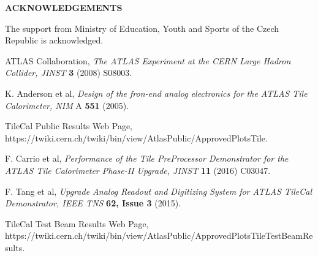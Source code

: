 \documentclass[10pt]{article}
\def\Acknowledgements{\bigskip  \bigskip \begin{center} \begin{large}
             \bf ACKNOWLEDGEMENTS \end{large}\end{center}}
\begin{document}
\Acknowledgements
The support from Ministry of Education, Youth and Sports of the Czech Republic is acknowledged.

\begin{thebibliography}{99}

 ATLAS Collaboration, {\it The ATLAS Experiment at the CERN Large Hadron Collider, JINST} {\bf 3} (2008) S08003.
  
   K. Anderson et al, {\it Design of the fron-end analog electronics for the ATLAS Tile Calorimeter, NIM} A {\bf 551} (2005).
 
  TileCal Public Results Web Page, https://twiki.cern.ch/twiki/bin/view/AtlasPublic/ApprovedPlotsTile.
 
  F. Carrio et al, {\it Performance of the Tile PreProcessor Demonstrator for the ATLAS Tile Calorimeter
Phase-II Upgrade, JINST} {\bf 11} (2016) C03047.

  F. Tang et al, {\it Upgrade Analog Readout and Digitizing System for ATLAS TileCal Demonstrator, IEEE
TNS} {\bf 62, Issue 3} (2015).
 
  TileCal Test Beam Results Web Page, \\https://twiki.cern.ch/twiki/bin/view/AtlasPublic/ApprovedPlotsTileTestBeamResults.




\end{thebibliography}

 
\end{document}
